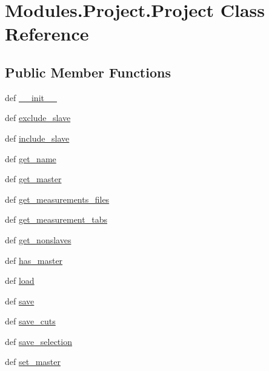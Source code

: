 \hypertarget{classModules_1_1Project_1_1Project}{\section{Modules.\-Project.\-Project Class Reference}
\label{classModules_1_1Project_1_1Project}
}
\subsection*{Public Member Functions}
\begin{DoxyCompactItemize}
\item 
def \hyperlink{classModules_1_1Project_1_1Project_a8b518c632e7abf15987810130671bd41}{\-\_\-\-\_\-init\-\_\-\-\_\-}
\item 
def \hyperlink{classModules_1_1Project_1_1Project_a51c72dd6e4387f92f5e41cef8b7d56db}{exclude\-\_\-slave}
\item 
def \hyperlink{classModules_1_1Project_1_1Project_ac660b915cc6bdff73d3eeae889f16918}{include\-\_\-slave}
\item 
def \hyperlink{classModules_1_1Project_1_1Project_a3db947d315829ee0e06b05be01aa8544}{get\-\_\-name}
\item 
def \hyperlink{classModules_1_1Project_1_1Project_a234229c766c554aa3c3a51b9f3a77ec8}{get\-\_\-master}
\item 
def \hyperlink{classModules_1_1Project_1_1Project_a598802299ac415e65888ab70140e89bc}{get\-\_\-measurements\-\_\-files}
\item 
def \hyperlink{classModules_1_1Project_1_1Project_a00a02f9db1709eef854920f0b579e6c0}{get\-\_\-measurement\-\_\-tabs}
\item 
def \hyperlink{classModules_1_1Project_1_1Project_a51a80de6a442b545c5cd60d840656460}{get\-\_\-nonslaves}
\item 
def \hyperlink{classModules_1_1Project_1_1Project_a86c216b2840c36076ad715914a5e43b8}{has\-\_\-master}
\item 
def \hyperlink{classModules_1_1Project_1_1Project_ab0b85dc510ae06fce07c18e9612343ab}{load}
\item 
def \hyperlink{classModules_1_1Project_1_1Project_a31663ab8365b326f3645049c20e79584}{save}
\item 
def \hyperlink{classModules_1_1Project_1_1Project_a3370b1b3818eb2fb3d1b1e14d3ea7cc2}{save\-\_\-cuts}
\item 
def \hyperlink{classModules_1_1Project_1_1Project_a66db9bc0dd3fc8c691a673150e6cff5a}{save\-\_\-selection}
\item 
def \hyperlink{classModules_1_1Project_1_1Project_a3c3ae9458c4ccea13f75935d57ce6d99}{set\-\_\-master}
\end{DoxyCompactItemize}
